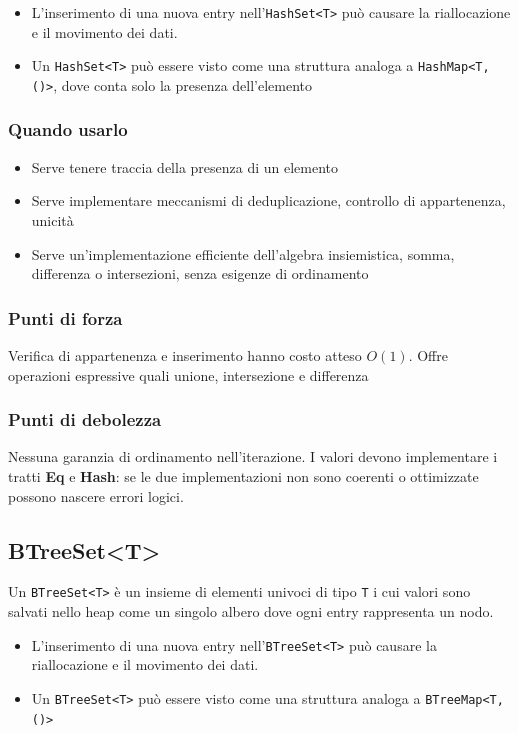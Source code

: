 \begin{itemize}
  \item L'inserimento di una nuova entry nell'\texttt{HashSet<T>} può causare la riallocazione e il movimento dei dati.
  \item Un \texttt{HashSet<T>} può essere visto come una struttura analoga a \texttt{HashMap<T, ()>},
        dove conta solo la presenza dell'elemento
\end{itemize}

\subsubsection{Quando usarlo}

\begin{itemize}
  \item Serve tenere traccia della presenza di un elemento
  \item Serve implementare meccanismi di deduplicazione, controllo di appartenenza, unicità
  \item Serve un'implementazione efficiente dell'algebra insiemistica, somma, differenza o intersezioni, senza esigenze di ordinamento
\end{itemize}

\subsubsection{Punti di forza}
Verifica di appartenenza e inserimento hanno costo atteso $O(1)$. Offre
operazioni espressive quali unione, intersezione e differenza


\subsubsection{Punti di debolezza}

Nessuna garanzia di ordinamento nell'iterazione.
I valori devono implementare i tratti \textbf{Eq} e \textbf{Hash}: se le due implementazioni non sono coerenti o
ottimizzate possono nascere errori logici.


\subsection{BTreeSet<T>}

Un \texttt{BTreeSet<T>} è un insieme di elementi univoci di tipo \texttt{T} i cui
valori sono salvati nello heap come un singolo albero dove ogni entry rappresenta un nodo.

\begin{itemize}
  \item L'inserimento di una nuova entry nell'\texttt{BTreeSet<T>} può causare la riallocazione e il movimento dei dati.
  \item Un \texttt{BTreeSet<T>} può essere visto come una struttura analoga a \texttt{BTreeMap<T, ()>}
\end{itemize}


